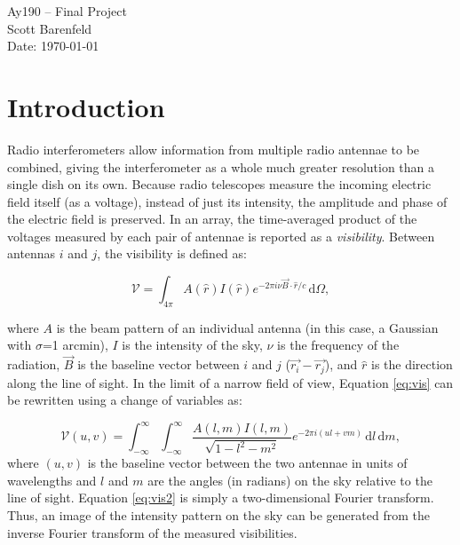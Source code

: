 \documentclass[11pt,letterpaper]{article}
\begin{document}
\begin{center}
\Large
Ay190 -- Final Project\\
Scott Barenfeld\\
Date: \today
\end{center}

\section{Introduction}
Radio interferometers allow information from multiple radio antennae to be 
combined, giving the interferometer as a whole much greater resolution than 
a single dish on its own.  Because radio telescopes measure the incoming 
electric field itself (as a voltage), instead of just its intensity, the 
amplitude and phase of the electric field is preserved.  In an array, the 
time-averaged product of the voltages measured by each pair of antennae is 
reported as a \emph{visibility}.  Between antennas $i$ and $j$, the 
visibility is defined as:

\begin{equation}\label{eq:vis}
\mathcal{V}=\int_{4\pi} \! A(\hat{r})I(\hat{r})e^{-2\pi i\nu\vec{B}\cdot\hat{r}/c} \, \mathrm{d}\Omega,
\end{equation} 

where $A$ is the beam pattern of an individual antenna (in this case, a Gaussian 
with $\sigma$=1 arcmin), $I$ is the intensity 
of the sky, $\nu$ is the frequency of the radiation, $\vec{B}$ is the baseline 
vector between $i$ and $j$ ($\vec{r_i}-\vec{r_j}$), and $\hat{r}$ is the 
direction along the line of sight.  In the limit of a narrow field of view, 
Equation \ref{eq:vis} can be rewritten using a change of variables as: 

\begin{equation}\label{eq:vis2}
\mathcal{V}(u,v)=\int_{-\infty}^{\infty} \! \int_{-\infty}^{\infty} \! \frac{A(l,m)I(l,m)}{\sqrt{1-l^2-m^2}}e^{-2\pi i(ul+vm)} \, \mathrm{d}l \, \mathrm{d}m,
\end{equation}
where $(u,v)$ is the baseline vector between the two antennae in units of 
wavelengths and $l$ and $m$ are the angles (in radians) on the sky relative 
to the line of sight.  Equation \ref{eq:vis2} is simply a two-dimensional 
Fourier transform.  Thus, an image of the intensity pattern on the sky can 
be generated from the inverse Fourier transform of the measured visibilities.  
\end{document}
